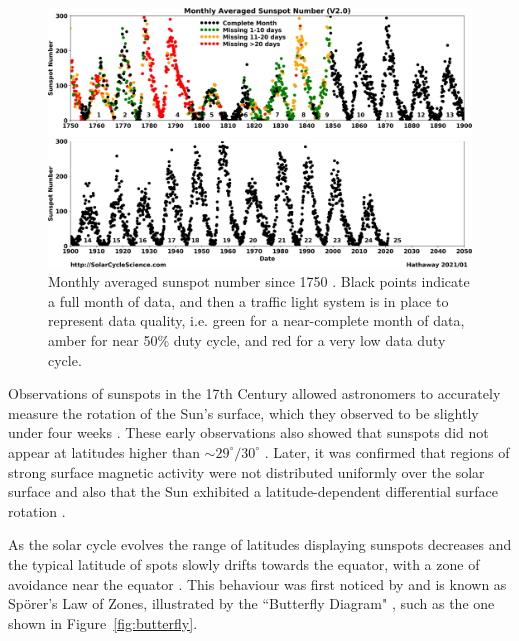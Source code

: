 \begin{figure}[ht!]
	\centering
	\includegraphics[width=\columnwidth]{SSN_monthly_landscape.png}
	\caption{Monthly averaged sunspot number since 1750 \citep{hathaway_solar_2017}. Black points indicate a full month of data, and then a traffic light system is in place to represent data quality, i.e. green for a near-complete month of data, amber for near 50\% duty cycle, and red for a very low data duty cycle.}
	\label{fig:ssn}
\end{figure}

Observations of sunspots in the 17th Century allowed astronomers to accurately measure the rotation of the Sun's surface, which they observed to be slightly under four weeks \citep{casanovas_early_1997, casas_solar_2006, luminet_reception_2017}. These early observations also showed that sunspots did not appear at latitudes higher than $\sim29^{\circ}/30^{\circ}$ \citep{casanovas_early_1997}. Later, it was confirmed that regions of strong surface magnetic activity were not distributed uniformly over the solar surface and also that the Sun exhibited a latitude-dependent differential surface rotation \citep{lee_cyril_1858}. %

As the solar cycle evolves the range of latitudes displaying sunspots decreases and the typical latitude of spots slowly drifts towards the equator, with a zone of avoidance near the equator \citep{hathaway_solar_2015}. This behaviour was first noticed by \citet{carrington_observations_1863} and is known as Sp\"{o}rer's Law of Zones, illustrated by the ``Butterfly Diagram" \citep{maunder_spoerers_1903, maunder_note_1904}, such as the one shown in Figure~\ref{fig:butterfly}.

